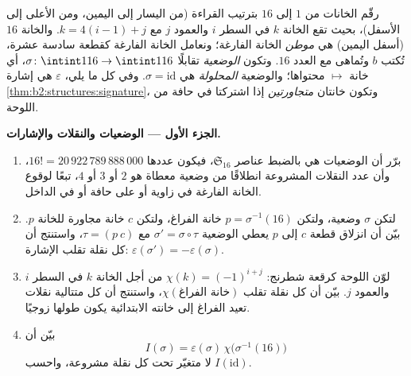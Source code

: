 \begin{problem}
\label{pb:b2:structures:1}
رقّم الخانات من $1$ إلى $16$ بترتيب القراءة (من اليسار إلى اليمين،
ومن الأعلى إلى الأسفل)، بحيث تقع الخانة $k$ في السطر $i$ والعمود $j$
مع $k
= 4(i - 1) + j$. والخانة $16$ (أسفل اليمين) هي \emph{موطن}
الخانة الفارغة؛ ونعامل الخانة الفارغة كقطعة سادسة عشرة،
تُكتب $b$ وتُماهى مع العدد $16$. وتكون
\emph{الوضعية} تقابلًا $\sigma \colon \intint1{16}
\to \intint1{16}$، أي خانة $\mapsto$ محتواها؛ والوضعية
\emph{المحلولة} هي $\sigma = \mathrm{id}$. وفي كل ما يلي،
$\varepsilon$ هي إشارة
\cref{thm:b2:structures:signature}، وتكون خانتان
\emph{متجاورتين} إذا اشتركتا في حافة من اللوحة.

\medskip
\noindent\textbf{الجزء الأول --- الوضعيات والنقلات والإشارات.}
\begin{enumerate}
  \item برّر أن الوضعيات هي بالضبط عناصر
        $\mathfrak{S}_{16}$، فيكون عددها $16! =
        20\,922\,789\,888\,000$، وأن عدد
        النقلات المشروعة انطلاقًا من وضعية معطاة هو $2$ أو $3$ أو $4$،
        تبعًا لوقوع الخانة الفارغة في زاوية أو على حافة أو
        في الداخل.
  \item لتكن $\sigma$ وضعية، ولتكن $p = \sigma^{-1}(16)$
        خانة الفراغ، ولتكن $c$ خانة مجاورة للخانة $p$. بيّن
        أن انزلاق قطعة $c$ إلى $p$ يعطي
        الوضعية $\sigma' = \sigma \circ \tau$ مع $\tau =
        (p\ c)$، واستنتج أن كل نقلة تقلب الإشارة:
        $\varepsilon(\sigma') = -\varepsilon(\sigma)$.
  \item لوّن اللوحة كرقعة شطرنج: $\chi(k) = (-1)^{i+j}$ من أجل الخانة
        $k$ في السطر $i$ والعمود $j$. بيّن أن كل نقلة تقلب
        $\chi(\text{خانة الفراغ})$، واستنتج أن كل
        متتالية نقلات تعيد الفراغ إلى خانته الابتدائية
        يكون طولها زوجيًا.
  \item بيّن أن
        \[
        I(\sigma) = \varepsilon(\sigma)\,
        \chi\bigl(\sigma^{-1}(16)\bigr)
        \]
        لا متغيّر تحت كل نقلة مشروعة، واحسب
        $I(\mathrm{id})$.
\end{enumerate}


\end{problem}
